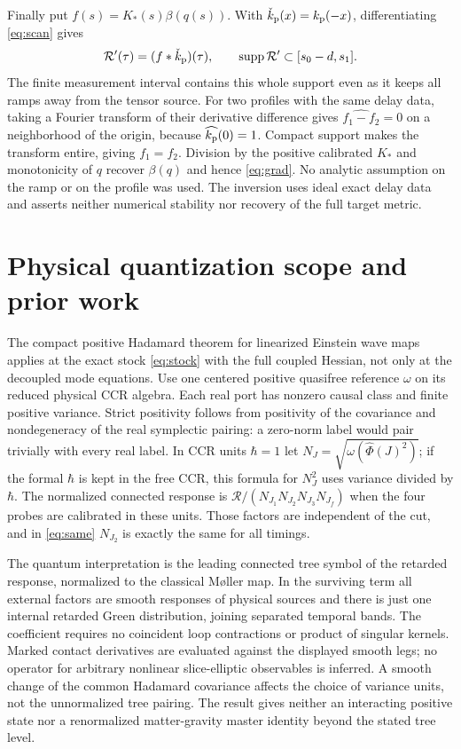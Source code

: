 \documentclass[11pt]{article}
\newcommand{\supp}{\operatorname{supp}}
\numberwithin{equation}{section}
\begin{document}
Finally put $f(s)=K_*(s)\beta(q(s))$. With $\check k_{\rm p}(x)=k_{\rm p}(-x)$, differentiating \eqref{eq:scan} gives
\begin{equation}
          \mathcal R'(\tau)=(f*\check k_{\rm p})(\tau),\qquad
          \supp\mathcal R'\subset[s_0-d,s_1].
 \label{eq:conv}
\end{equation}
The finite measurement interval contains this whole support even as it keeps all ramps away from the tensor source. For two profiles with the same delay data, taking a Fourier transform of their derivative difference gives $\widehat{f_1-f_2}=0$ on a neighborhood of the origin, because $\widehat{k_{\rm p}}(0)=1$. Compact support makes the transform entire, giving $f_1=f_2$. Division by the positive calibrated $K_*$ and monotonicity of $q$ recover $\beta(q)$ and hence \eqref{eq:grad}. No analytic assumption on the ramp or on the profile was used. The inversion uses ideal exact delay data and asserts neither numerical stability nor recovery of the full target metric.

\section{Physical quantization scope and prior work}\label{sec:scope}

The compact positive Hadamard theorem for linearized Einstein wave maps \cite[compact Cauchy theorem]{p71} applies at the exact stock \eqref{eq:stock} with the full coupled Hessian, not only at the decoupled mode equations. Use one centered positive quasifree reference $\omega$ on its reduced physical CCR algebra. Each real port has nonzero causal class and finite positive variance. Strict positivity follows from positivity of the covariance and nondegeneracy of the real symplectic pairing: a zero-norm label would pair trivially with every real label. In CCR units $\hbar=1$ let $N_J=\sqrt{\omega(\widehat\Phi(J)^2)}$; if the formal $\hbar$ is kept in the free CCR, this formula for $N_J^2$ uses variance divided by $\hbar$. The normalized connected response is $\mathcal R/(N_{J_1}N_{J_2}N_{J_3}N_{J_f})$ when the four probes are calibrated in these units. Those factors are independent of the cut, and in \eqref{eq:same} $N_{J_2}$ is exactly the same for all timings.

The quantum interpretation is the leading connected tree symbol of the retarded response, normalized to the classical M\o ller map. In the surviving term all external factors are smooth responses of physical sources and there is just one internal retarded Green distribution, joining separated temporal bands. The coefficient requires no coincident loop contractions or product of singular kernels. Marked contact derivatives are evaluated against the displayed smooth legs; no operator for arbitrary nonlinear slice-elliptic observables is inferred. A smooth change of the common Hadamard covariance affects the choice of variance units, not the unnormalized tree pairing. The result gives neither an interacting positive state nor a renormalized matter-gravity master identity beyond the stated tree level.
\end{document}
